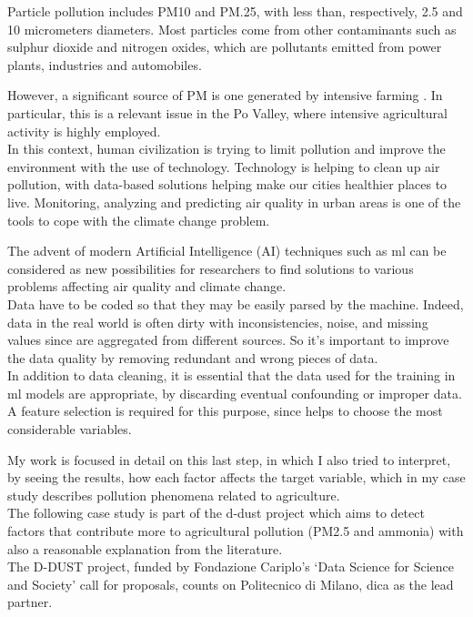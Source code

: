 Particle pollution includes PM10 and PM.25, with less than, respectively, 2.5 and 10 micrometers diameters.
Most particles come from other contaminants such as sulphur dioxide and nitrogen oxides, which are pollutants emitted from power plants, industries and automobiles.\par
However, a significant source of PM is one generated by intensive farming \cite{burkart2007diffuse}.
In particular, this is a relevant issue in the Po Valley, where intensive agricultural activity is highly employed.\\
In this context, human civilization is trying to limit pollution and improve the environment with the use of technology.\newline
Technology is helping to clean up air pollution, with data-based solutions helping make our cities healthier places to live.\newline
Monitoring, analyzing and predicting air quality in urban areas is one of the tools to cope with the climate change problem.\par
The advent of modern Artificial Intelligence (AI) techniques such as \gls{ml} can be considered as new possibilities for researchers to find solutions to various problems affecting air quality and climate change.
\\  
Data have to be coded so that they may be easily parsed by the machine. 
Indeed, data in the real world is often dirty with inconsistencies, noise, and missing values since are aggregated from different sources. So it's important to improve the data quality by removing redundant and wrong pieces of data.\\
In addition to data cleaning, it is essential that the data used for the training in \acrshort{ml} models are appropriate, by discarding eventual confounding or improper data.\\
A feature selection is required for this purpose, since helps to choose the most considerable variables.\par
My work is focused in detail on this last step, in which I also tried to interpret, by seeing the results, how each factor affects the target variable, which in my case study describes pollution phenomena related to agriculture.\\
The following case study is part of the \gls{d-dust} project which aims to detect factors that contribute more to agricultural pollution (PM2.5 and ammonia) with also a reasonable explanation from the literature.\\
The D-DUST project, funded by Fondazione Cariplo’s ‘Data Science for Science and Society’ call for proposals, counts on Politecnico di Milano, \gls{dica} as the lead partner.\newline
